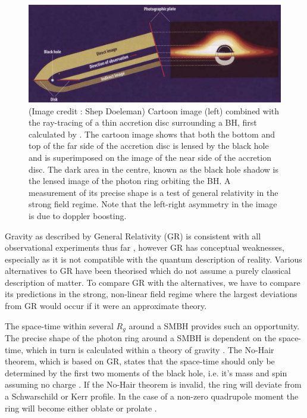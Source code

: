 \begin{figure}[h!]
\includegraphics[width=\columnwidth]{Images/lensed_cartoon}
\caption[Cartoon image combined with the ray-tracing of a thin accretion disc surrounding a BH.  The dark area in the centre, known as the black hole shadow is the lensed image of the photon ring orbiting the BH.]{(Image credit : Shep Doeleman) Cartoon image (left) combined with the ray-tracing of a thin accretion disc surrounding a BH, first calculated by \citet{Luminet_1979}. The cartoon image shows that both the bottom and top of the far side of the accretion disc is lensed by the black hole and is superimposed on the image of the near side of the accretion disc. The dark area in the centre, known as the black hole shadow is the lensed image of the photon ring orbiting the BH. A measurement of its precise shape is a test of general relativity in the strong field regime. Note that the left-right asymmetry in the image is due to doppler boosting. \label{fig:grmhd}%
}
\end{figure}


Gravity as described by General Relativity (GR) is consistent with all observational experiments thus far \citep[e.g.][and references therein]{Kramer_2006}, however GR has conceptual weaknesses, especially as it is not compatible with the quantum description of reality. Various alternatives to GR have been theorised which do not assume a purely classical description of matter. To compare GR with the alternatives, we have to compare its predictions in the strong, non-linear field regime where the largest deviations from GR would occur if it were an approximate theory.


The space-time within several $R_g$ around a SMBH provides such an opportunity. The precise shape of the photon ring around a SMBH is dependent on the space-time, which in turn is calculated within a theory of gravity \citep{Takahashi_2004}. The No-Hair theorem, which is based on GR, states that the space-time should only be determined by the first two moments of the black hole, i.e. it's mass and spin assuming no charge \citep[][and references therein]{Hawking_1972}. If the No-Hair theorem is invalid, the ring will deviate from a Schwarschild or Kerr profile. In the case of a non-zero quadrupole moment the ring will become either oblate or prolate \citep[e.g.][]{Johannsen_2010}. 

